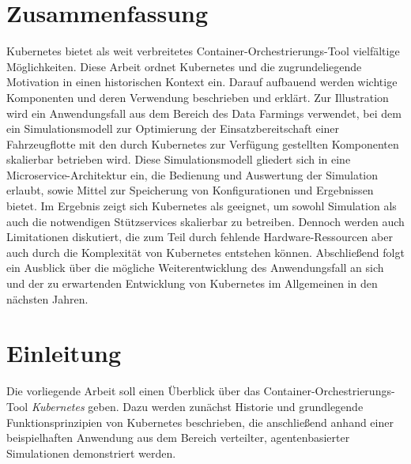 \documentclass[11pt,a4paper]{article}
\begin{document}
\tableofcontents

\section{Zusammenfassung}
Kubernetes bietet als weit verbreitetes Container-Orchestrierungs-Tool vielfältige Möglichkeiten.
Diese Arbeit ordnet Kubernetes und die zugrundeliegende Motivation in einen historischen Kontext ein. 
Darauf aufbauend werden wichtige Komponenten und deren Verwendung beschrieben und erklärt.
Zur Illustration wird ein Anwendungsfall aus dem Bereich des Data Farmings verwendet, 
bei dem ein Simulationsmodell zur Optimierung der Einsatzbereitschaft einer Fahrzeugflotte mit den 
durch Kubernetes zur Verfügung gestellten Komponenten skalierbar betrieben wird. Diese Simulationsmodell
gliedert sich in eine Microservice-Architektur ein, die Bedienung und Auswertung der Simulation erlaubt, 
sowie Mittel zur Speicherung von Konfigurationen und Ergebnissen bietet.
Im Ergebnis zeigt sich Kubernetes als geeignet, um sowohl Simulation als auch die notwendigen 
Stützservices skalierbar zu betreiben.
Dennoch werden auch Limitationen diskutiert, die zum Teil durch fehlende 
Hardware-Ressourcen aber auch durch die Komplexität von Kubernetes entstehen können.
Abschließend folgt ein Ausblick über die mögliche Weiterentwicklung des Anwendungsfall
an sich und der zu erwartenden Entwicklung von Kubernetes im Allgemeinen in den nächsten Jahren.



\section{Einleitung}
\label{sec:einleitung}
Die vorliegende Arbeit soll einen Überblick über das Container-Orchestrierungs-Tool \emph{Kubernetes} geben. 
Dazu werden zunächst Historie und grundlegende Funktionsprinzipien von Kubernetes beschrieben, die anschließend
anhand einer beispielhaften Anwendung aus dem Bereich verteilter, agentenbasierter Simulationen demonstriert werden.
\end{document}
